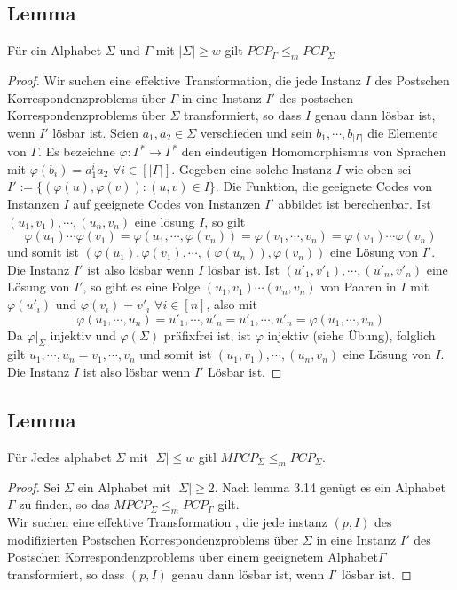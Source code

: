   \subsection{Lemma} Für ein Alphabet $\Sigma$ und $\Gamma$ mit $|\Sigma| \geq w$ gilt $PCP_{\Gamma} \leq_m PCP_{\Sigma}$
  \begin{proof}
    Wir suchen eine effektive Transformation, die jede Instanz $I$ des Postschen Korrespondenzproblems über $\Gamma$ in eine Instanz $I'$ des postschen Korrespondenzproblems über $\Sigma$ transformiert, so dass $I$ genau dann lösbar ist, wenn $I'$ lösbar ist. Seien $a_1, a_2 \in \Sigma$ verschieden und sein $b_1, \cdots, b_{|\Gamma|}$ die Elemente von $\Gamma$. Es bezeichne $\varphi : \Gamma^* \to \Gamma^*$ den eindeutigen Homomorphismus von Sprachen mit $\varphi (b_i) = a^i_1 a_2$ $\forall i \in [|\Gamma|]$. Gegeben eine solche Instanz $I$ wie oben sei $I' := \{(\varphi(u), \varphi(v)) : (u, v) \in I\}$. Die Funktion, die geeignete Codes von Instanzen $I$ auf geeignete Codes von Instanzen $I'$ abbildet ist berechenbar. Ist $(u_1, v_1), \cdots, (u_n, v_n)$ eine lösung $I$, so gilt \[\varphi(u_1) \cdots \varphi(v_1) = \varphi(u_1, \cdots, \varphi(v_n)) = \varphi(v_1, \cdots, v_n) = \varphi(v_1) \cdots \varphi(v_n)\] und somit ist $(\varphi(u_1), \varphi(v_1), \cdots, (\varphi(u_n)), \varphi(v_n))$ eine Lösung von $I'$. Die Instanz $I'$ ist also lösbar wenn $I$ lösbar ist. Ist $(u'_1, v'_1), \cdots, (u'_n, v'_n)$ eine Lösung von $I'$, so gibt es eine Folge $(u_1, v_1)\cdots (u_n, v_n)$ von Paaren in $I$ mit $\varphi(u'_i)$ und $\varphi(v_i) = v'_i$ $\forall i \in [n]$, also mit \[\varphi(u_1, \cdots, u_n) = u'_1, \cdots, u'_n = u'_1, \cdots, u'_n =\varphi(u_1, \cdots, u_n)\] Da $\varphi \vert_{\Sigma}$ injektiv und $\varphi (\Sigma)$ präfixfrei ist, ist $\varphi$ injektiv (siehe Übung), folglich gilt $u_1, \cdots, u_n = v_1, \cdots, v_n$ und somit ist $(u_1, v_1), \cdots, (u_n, v_n)$ eine Lösung von $I$. Die Instanz $I$ ist also lösbar wenn $I'$ Lösbar ist.
  \end{proof}


  \subsection{Lemma} Für Jedes alphabet $\Sigma$ mit $|\Sigma| \leq w$ gitl $MPCP_{\Sigma} \leq_m PCP_{\Sigma}$.
  \begin{proof}
    Sei $\Sigma$ ein Alphabet mit $|\Sigma| \geq 2$. Nach lemma 3.14 genügt es ein Alphabet $\Gamma$ zu finden, so das $MPCP_{\Sigma} \leq_m PCP_{\Gamma}$ gilt. \\Wir suchen eine effektive Transformation , die jede instanz $(p, I)$ des modifizierten Postschen Korrespondenzproblems über $\Sigma$ in eine Instanz $I'$ des Postschen Korrespondenzproblems über einem geeignetem Alphabet$\Gamma$ transformiert, so dass $(p, I)$ genau dann lösbar ist, wenn $I'$ lösbar ist.
  \end{proof}
